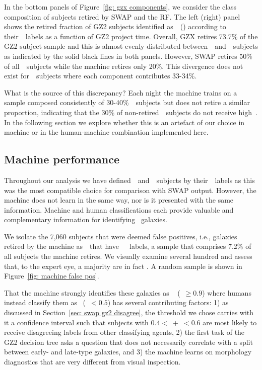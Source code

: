 In the bottom panels of Figure~\ref{fig: gzx components}, we consider the class
composition of subjects retired by SWAP and the RF. The left (right) panel shows the retired fraction of GZ2 subjects identified as~\feat~(\notfeat) according to their~\raw~labels as a function of GZ2 project time. Overall, GZX retires 73.7\% of the GZ2 subject sample and this is almost evenly distributed between~\feat~and~\notfeat~subjects as indicated by the solid black lines in both panels. However, SWAP retires 50\% of all~\feat~subjects while the machine retires only 20\%. This divergence does not exist for~\notfeat~subjects where each component contributes 33-34\%. 

What is the source of this discrepancy? Each night the machine trains on a sample composed consistently of 30-40\%~\feat~subjects but does not retire a similar proportion, indicating that the 30\% of non-retired~\feat~subjects do not receive high~\pmachine. In the following section we explore whether this is an artefact of our choice in machine or in the human-machine combination implemented here. 


\subsection{Machine performance}\label{sec: machine performance}

Throughout our analysis we have defined~\feat~and~\notfeat~subjects by 
their~\raw~labels as this was the most compatible choice for comparison with SWAP output. However, the machine does not learn in the same way, nor is it presented with the same information. Machine and human classifications each provide valuable and complementary information for identifying \feat~galaxies.

We isolate the 7,060 subjects that were deemed false positives, i.e., galaxies 
retired by the machine as~\feat~that have~\notfeat~\raw~labels, a sample that
comprises 7.2\% of all subjects the machine retires. We visually examine several hundred and assess that, to the expert eye, a majority are in fact \feat. A random sample is shown in Figure~\ref{fig: machine false pos}. 


That the machine strongly identifies these galaxies as \feat~
(\pmachine~$\ge 0.9$) where humans instead classify them as \notfeat~(\ffeat~$< 0.5$) has several contributing factors: 1) as discussed in Section~\ref{sec: swap gz2 disagree}, the threshold we chose carries with it a confidence interval such that subjects with $0.4 <$~\ffeat+\fstar~$< 0.6$ are most likely to receive disagreeing labels from other classifying agents, 2) the first task of the GZ2 decision tree asks a question that does not necessarily correlate with a split between early- and
 late-type galaxies, and 3) the machine learns on morphology diagnostics
 that are very different from visual inspection.

